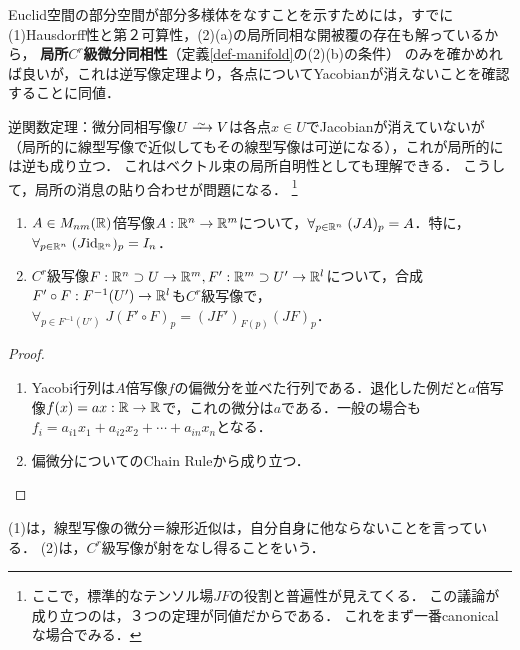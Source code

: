 \documentclass[uplatex,dvipdfmx]{jsreport}
\begin{document}
\begin{tcolorbox}[colframe=ForestGreen, colback=ForestGreen!10!white,breakable,colbacktitle=ForestGreen!40!white,coltitle=black,fonttitle=\bfseries\sffamily,
    title=Euclid空間に埋め込まれた多様体とは，行列式関数の正則点からなる集合のこと]
        Euclid空間の部分空間が部分多様体をなすことを示すためには，すでに(1)Hausdorff性と第２可算性，(2)(a)の局所同相な開被覆の存在も解っているから，
        \textbf{局所$C^r$級微分同相性}（定義\ref{def-manifold}の(2)(b)の条件）
        のみを確かめれば良いが，これは逆写像定理より，各点についてYacobianが消えないことを確認することに同値．

        逆関数定理：微分同相写像$U\iso V$は各点$x\in U$でJacobianが消えていないが（局所的に線型写像で近似してもその線型写像は可逆になる），これが局所的には逆も成り立つ．
        これはベクトル束の局所自明性としても理解できる．
        こうして，局所の消息の貼り合わせが問題になる．
        \footnote{ここで，標準的なテンソル場$JF$の役割と普遍性が見えてくる．
        この議論が成り立つのは，３つの定理が同値だからである．
        これをまず一番canonicalな場合でみる．}
\end{tcolorbox}

\begin{lemma}[Yacobi行列の性質]\mbox{}
    \begin{enumerate}
        \item $A\in M_{nm}(\mathbb{R})$倍写像$A:\mathbb{R}^n\to\mathbb{R}^m$について，$\forall_{p\in\mathbb{R}^n}\;(JA)_p=A$．特に，$\forall_{p\in\mathbb{R}^n}\;(J\mathrm{id}_{\mathbb{R}^n})_p=I_n$．
        \item $C^r$級写像$F:\mathbb{R}^n\supset U\to\mathbb{R}^m,F':\mathbb{R}^m\supset U'\to \mathbb{R}^l$について，合成$F'\circ F:F^{-1}(U')\to\mathbb{R}^l$も$C^r$級写像で，$\forall_{p\in F^{-1}(U')}\;J(F'\circ F)_p=(JF')_{F(p)}(JF)_p$．
    \end{enumerate}
\end{lemma}
\begin{proof}\mbox{}
    \begin{enumerate}
        \item Yacobi行列は$A$倍写像$f$の偏微分を並べた行列である．退化した例だと$a$倍写像$f(x)=ax:\mathbb{R}\to\mathbb{R}$で，これの微分は$a$である．一般の場合も$f_i=a_{i1}x_1+a_{i2}x_2+\cdots+a_{in}x_n$となる．
        \item 偏微分についてのChain Ruleから成り立つ．
    \end{enumerate}
\end{proof}
\begin{remarks}
    (1)は，線型写像の微分＝線形近似は，自分自身に他ならないことを言っている．
    (2)は，$C^r$級写像が射をなし得ることをいう．
\end{remarks}
\end{document}
